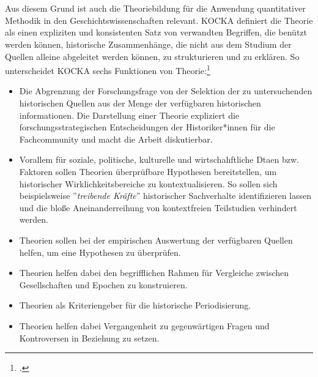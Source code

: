 \documentclass[12pt,a4paper]{article}
\begin{document}
\\
\\
Aus diesem Grund ist auch die Theoriebildung für die Anwendung quantitativer Methodik in den Geschichtswissenschaften relevant.
KOCKA definiert die Theorie als einen expliziten und konsistenten Satz von verwandten Begriffen, die benützt werden können, historische Zusammenhänge, die nicht aus dem Studium der Quellen alleine abgeleitet werden können, zu strukturieren und zu erklären. So unterscheidet KOCKA  sechs Funktionen von Theorie:\footcite[Vgl.][S.10-14]{schroder1988historische}  
\begin{itemize}
\item Die Abgrenzung der Forschungsfrage von der Selektion der zu untersuchenden historischen Quellen aus der Menge der  verfügbaren historischen informationen. Die Darstellung einer Theorie expliziert die forschungsstrategischen Entscheidungen der Historiker*innen für die Fachcommunity und macht die Arbeit diskutierbar.
\item Vorallem für soziale, politische, kulturelle und wirtschahftliche Dtaen bzw.  Faktoren sollen Theorien überprüfbare Hypothesen bereitstellen, um historischer Wirklichkeitsbereiche zu kontextualisieren. So sollen sich beispielsweise ''\textit{treibende Kräfte}'' historischer Sachverhalte  identifizieren lassen und die bloße Aneinanderreihung von kontextfreien Teilstudien verhindert werden.
\item Theorien sollen bei der empirischen Auswertung der verfügbaren Quellen helfen, um eine Hypothesen zu überprüfen.
\item Theorien helfen dabei den begrifflichen Rahmen für Vergleiche zwischen Gesellschaften und Epochen zu konstruieren.
\item Theorien als Kriteriengeber für die historische Periodisierung.
\item  Theorien helfen dabei Vergangenheit  zu gegenwärtigen Fragen und Kontroversen in Beziehung zu setzen. 
\end{itemize}


\newpage
\end{document}
